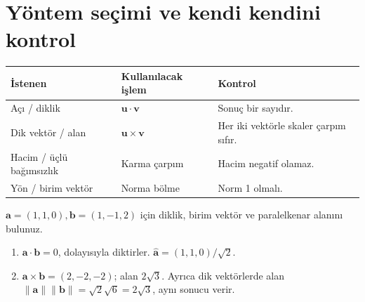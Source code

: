 \section{Yöntem seçimi ve kendi kendini kontrol}
\begin{center}\small\renewcommand{\arraystretch}{1.35}\begin{tabularx}{\linewidth}{>{\raggedright\arraybackslash}X >{\raggedright\arraybackslash}X >{\raggedright\arraybackslash}X}\toprule
\textbf{İstenen} & \textbf{Kullanılacak işlem} & \textbf{Kontrol}\\\midrule
Açı / diklik & \(\mathbf u\cdot\mathbf v\) & Sonuç bir sayıdır.\\
Dik vektör / alan & \(\mathbf u\times\mathbf v\) & Her iki vektörle skaler çarpım sıfır.\\
Hacim / üçlü bağımsızlık & Karma çarpım & Hacim negatif olamaz.\\
Yön / birim vektör & Norma bölme & Norm 1 olmalı.\\
\bottomrule\end{tabularx}\end{center}
\begin{tcolorbox}[title={Örnek 1.8 | Pekiştirme},colframe=accent]\(\mathbf a=(1,1,0),\mathbf b=(1,-1,2)\) için diklik, birim vektör ve paralelkenar alanını bulunuz.
\par\vspace{1mm}{\scriptsize\sffamily Pekiştirme}\end{tcolorbox}
\begin{tcolorbox}[title={Adım adım çözüm},colback=green!3!white,colframe=green]\begin{enumerate}
\item \(\mathbf a\cdot\mathbf b=0\), dolayısıyla diktirler. \(\widehat{\mathbf a}=(1,1,0)/\sqrt2\).
\item \(\mathbf a\times\mathbf b=(2,-2,-2)\); alan \(2\sqrt3\). Ayrıca dik vektörlerde alan \(\|\mathbf a\|\|\mathbf b\|=\sqrt2\sqrt6=2\sqrt3\), aynı sonucu verir.
\end{enumerate}\end{tcolorbox}

\clearpage
